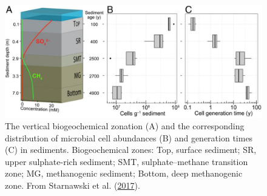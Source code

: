 \documentclass[
  12 pt,
]{book}
\begin{document}
\begin{figure}

{\centering \includegraphics[width=0.95\linewidth]{figures/starnawski2012} 

}

\caption{The vertical biogeochemical zonation (A) and the corresponding distribution of microbial cell abundances (B) and generation times (C) in sediments. Biogeochemical zones: Top, surface sediment; SR, upper sulphate-rich sediment; SMT, sulphate--methane transition zone; MG, methanogenic sediment; Bottom, deep methanogenic zone. From Starnawski et al. (\protect\hyperlink{ref-Starnawski2017}{2017}).}\label{fig:starnawski2017}
\end{figure}
\end{document}
